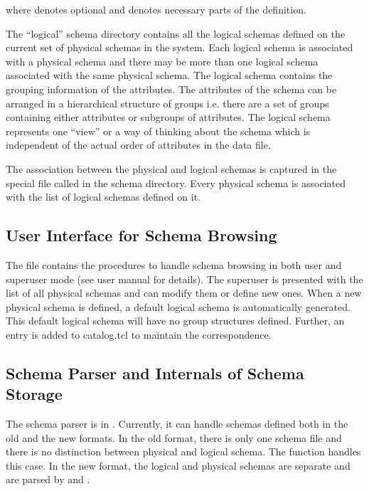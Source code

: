 where \code{[]} denotes optional and \code{<>} denotes necessary parts
of the definition.

The ``logical'' schema directory contains all the logical schemas
defined on the current set of physical schemas in the system.  Each
logical schema is associated with a physical schema and there may be
more than one logical schema associated with the same physical
schema. The logical schema contains the grouping information of the
attributes.  The attributes of the schema can be arranged in a
hierarchical structure of groups i.e. there are a set of groups
containing either attributes or subgroups of attributes. The logical
schema represents one ``view'' or a way of thinking about the schema
which is independent of the actual order of attributes in the data
file.

The association between the physical and logical schemas is captured
in the special file called  in the schema
directory.  Every physical schema is associated with the list of
logical schemas defined on it.

\subsection{User Interface for Schema Browsing}

The file  contains the procedures to
handle schema browsing in both user and superuser mode (see user
manual for details).  The superuser is presented with the list of all
physical schemas and can modify them or define new ones. When a new
physical schema is defined, a default logical schema is automatically
generated. This default logical schema will have no group structures
defined.  Further, an entry is added to catalog.tcl to maintain the
correspondence.

\subsection{Schema Parser and Internals of Schema Storage}

The schema parser is in
. Currently, it can handle
schemas defined both in the old and the new formats. In the old
format, there is only one schema file and there is no distinction
between physical and logical schema. The function
 handles this case. In the new format, the
logical and physical schemas are separate and are parsed by
 and .

